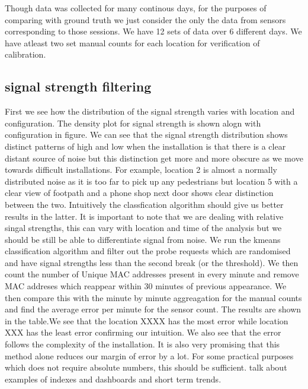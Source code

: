 Though data was collected for many continous days, for the purposes of comparing with ground truth we just consider the only the data from sensors corresponding to those sessions. We have 12 sets of data over 6 different days. We have atleast two set manual counts for each location for verification of calibration.

\subsection{signal strength filtering}
First we see how the distribution of the signal strength varies with location and configuration. 
The density plot for signal strength is shown alogn with configuration in figure.
We can see that the signal strength distribution shows distinct patterns of high and low when the installation is that there is a clear distant source of noise but this distinction get more and more obscure as we move towards difficult installations. 
For example, location 2 is almost a normally distributed noise as it is too far to pick up any pedestrians but location 5 with a clear view of footpath and a phone shop next door shows clear distinction between the two. 
Intuitively the classfication algorithm should give us better results in the latter. 
It is important to note that we are dealing with relative singal strengths, this can vary with location and time of the analysis but we should be still be able to differentiate signal from noise. 
We run the kmeans classification algorithm and filter out the probe requests which are randomised and have signal strengths less than the second break (or the threshold). 
We then count the number of Unique MAC addresses present in every minute and remove MAC addreses which reappear within 30 minutes of previous appearance. 
We then compare this with the minute by minute aggreagation for the manual counts and find the average error per minute for the sensor count. 
The results are shown in the table.We see that the location XXXX has the most error while location XXX has the least error confirming our intuition. 
We also see that the error follows the complexity of the installation. 
It is also very promising that this method alone reduces our margin of error by a lot. 
For some practical purposes which does not require absolute numbers, this should be sufficient. talk about examples of indexes and dashboards and short term trends. 

